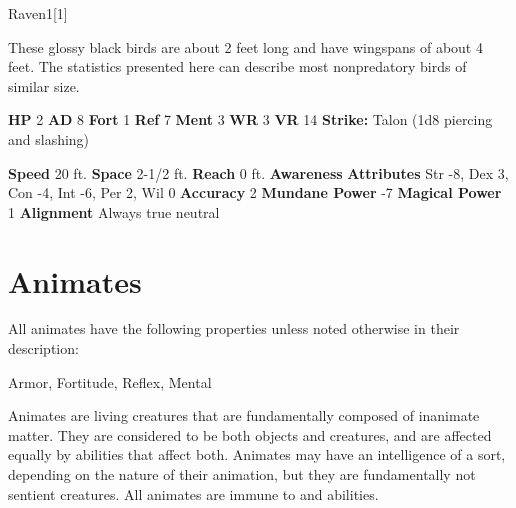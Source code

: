   
  \begin{monsection}{Raven}{1}[1]
    \vspace{-1em}\vspace{-1em}
    \vspace{0em}

    
      These glossy black birds are about 2 feet long and have wingspans of about 4 feet.
      The statistics presented here can describe most nonpredatory birds of similar size.
    
    

    \begin{spellcontent}
      \begin{spelltargetinginfo}
        \pari \textbf{HP} 2 \monsep
          \textbf{AD} 8 \monsep
          \textbf{Fort} 1 \monsep
          \textbf{Ref} 7 \monsep
          \textbf{Ment} 3
        \pari \textbf{WR} 3 \monsep
        \textbf{VR} 14
        \pari \textbf{Strike:}
            Talon  (1d8 piercing and slashing)
      \end{spelltargetinginfo}
    \end{spellcontent}
    \begin{monsterfooter}
      \pari \textbf{Speed} 20 ft. \monsep
        \textbf{Space} 2-1/2 ft. \monsep
        \textbf{Reach} 0 ft.
      \pari \textbf{Awareness} 
      \pari \textbf{Attributes}
        Str -8, Dex 3,
        Con -4, Int -6,
        Per 2, Wil 0
      \pari \textbf{Accuracy} 2 \monsep
        \textbf{Mundane Power} -7 \monsep
      \textbf{Magical Power} 1
      \pari \textbf{Alignment} Always true neutral
    \end{monsterfooter}
  \end{monsection}
  
  
        \section{Animates}

        All animates have the following properties unless noted otherwise in their description:
        
    
     Armor,
     Fortitude,
     Reflex,
     Mental
  
     Animates are living creatures that are fundamentally composed of inanimate matter.
    They are considered to be both objects and creatures, and are affected equally by abilities that affect both.
     Animates may have an intelligence of a sort, depending on the nature of their animation, but they are fundamentally not sentient creatures.
    All animates are immune to  and  abilities.
  

